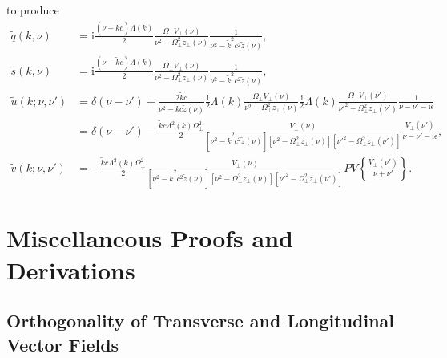 \documentclass{article}
\begin{document}
to produce
\begin{equation}
\begin{split}
\tilde{q}(k,\nu) &= \mathrm{i}\frac{(\nu + \tilde{k}c)\Lambda(k)}{2}\frac{\Omega_\perp V_\perp(\nu)}{\nu^2 - \Omega_\perp^2z_\perp(\nu)}\frac{1}{\nu^2 - \tilde{k}^2c^2\tilde{z}(\nu)},\\
\tilde{s}(k,\nu) &= \mathrm{i}\frac{(\nu - \tilde{k}c)\Lambda(k)}{2}\frac{\Omega_\perp V_\perp(\nu)}{\nu^2 - \Omega_\perp^2z_\perp(\nu)}\frac{1}{\nu^2 - \tilde{k}^2c^2\tilde{z}(\nu)},\\[0.5em]
\tilde{u}(k;\nu,\nu') &= \delta(\nu - \nu') + \frac{2\tilde{k}c}{\nu^2 - \tilde{k}c\tilde{z}(\nu)}\frac{\mathrm{i}}{2}\Lambda(k)\frac{\Omega_\perp V_\perp(\nu)}{\nu^2 - \Omega_\perp^2z_\perp(\nu)}\frac{\mathrm{i}}{2}\Lambda(k)\frac{\Omega_\perp V_\perp(\nu')}{\nu'^2 - \Omega_\perp^2z_\perp(\nu')}\frac{1}{\nu - \nu' - \mathrm{i}\epsilon}\\
&= \delta(\nu - \nu') - \frac{\tilde{k}c\Lambda^2(k)\Omega_\perp^2}{2}\frac{V_\perp(\nu)}{\left[\nu^2 - \tilde{k}^2c^2\tilde{z}(\nu)\right][\nu^2 - \Omega_\perp^2z_\perp(\nu)][\nu'^2 - \Omega_\perp^2z_\perp(\nu')]}\frac{V_\perp(\nu')}{\nu - \nu' - \mathrm{i}\epsilon},\\[0.5em]
\tilde{v}(k;\nu,\nu') &= - \frac{\tilde{k}c\Lambda^2(k)\Omega_\perp^2}{2}\frac{V_\perp(\nu)}{\left[\nu^2 - \tilde{k}^2c^2\tilde{z}(\nu)\right][\nu^2 - \Omega_\perp^2z_\perp(\nu)][\nu'^2 - \Omega_\perp^2z_\perp(\nu')]}PV\left\{\frac{V_\perp(\nu')}{\nu + \nu'}\right\}.
\end{split}
\end{equation}



















\section{Miscellaneous Proofs and Derivations}

\subsection{Orthogonality of Transverse and Longitudinal Vector Fields}\label{sec:helmholtzOrthogonality}
\end{document}
